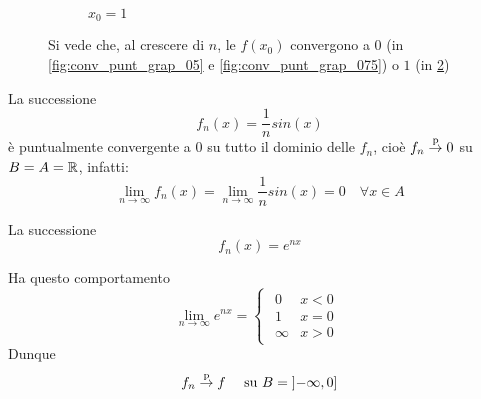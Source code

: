 \begin{observation}
\begin{figure}[H]
\begin{subfigure}{.33\textwidth}
{
			}
			\caption{$x_0 = 1$}
			\label{fig:conv_punt_grap_1}
		\end{subfigure}
		\caption{Si vede che, al crescere di $n$, le $f(x_0)$ convergono a $0$ (in \ref{fig:conv_punt_grap_05} e \ref{fig:conv_punt_grap_075}) o $1$ (in \ref{fig:conv_punt_grap_1})}
	\end{figure}
\end{observation}

\begin{example}
	La successione
	\[f_n(x)=\frac{1}{n}sin(x)\]
	è puntualmente convergente a $0$ su tutto il dominio delle $f_n$, cioè $f_n \overset{\text{p}}{\to} 0$ su $B = A = \mathbb{R}$, infatti:
	\[
		\lim\limits_{n \to \infty} f_n(x) = \lim\limits_{n \to \infty} \frac{1}{n} sin(x) = 0 \quad \forall x \in A
	\]
\end{example}
\begin{example}
	La successione
	\[f_n(x)=e^{nx}\]
	\begin{center}
	\end{center}
	Ha questo comportamento
	\[
		\lim\limits_{n \to \infty} e^{nx} =
		\begin{cases}
			\begin{array}{ll}
				0 & x<0\\
				1 & x=0\\
				\infty & x>0
			\end{array}
		\end{cases}
	\]
	Dunque
	\[f_n \overset{\text{p}}{\to} f\quad \text{ su } B = \left]-\infty,0\right]\]
\end{example}

